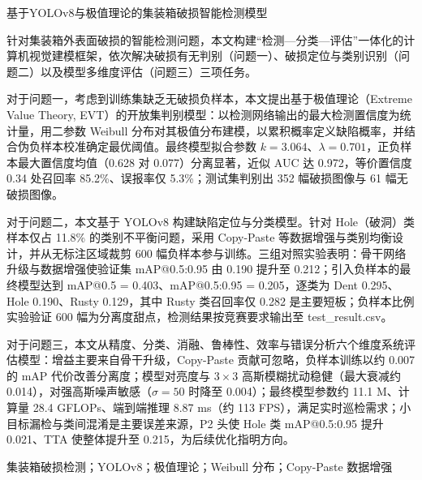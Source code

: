 \begin{center}
  {\heiti 基于YOLOv8与极值理论的集装箱破损智能检测模型}
\end{center}

\vspace{1.5em}


针对集装箱外表面破损的智能检测问题，本文构建“检测—分类—评估”一体化的计算机视觉建模框架，依次解决破损有无判别（问题一）、破损定位与类别识别（问题二）以及模型多维度评估（问题三）三项任务。

\vspace{0.35em}
对于问题一，考虑到训练集缺乏无破损负样本，本文提出基于极值理论（Extreme Value Theory, EVT）的开放集判别模型：以检测网络输出的最大检测置信度为统计量，用二参数 Weibull 分布对其极值分布建模，以累积概率定义缺陷概率，并结合伪负样本校准确定最优阈值。最终模型拟合参数 $k=3.064$、$\lambda=0.701$，正负样本最大置信度均值（0.628 对 0.077）分离显著，近似 AUC 达 0.972，等价置信度 0.34 处召回率 85.2\%、误报率仅 5.3\%；测试集判别出 352 幅破损图像与 61 幅无破损图像。

\vspace{0.35em}
对于问题二，本文基于 YOLOv8 构建缺陷定位与分类模型。针对 Hole（破洞）类样本仅占 11.8\% 的类别不平衡问题，采用 Copy-Paste 等数据增强与类别均衡设计，并从无标注区域裁剪 600 幅负样本参与训练。三组对照实验表明：骨干网络升级与数据增强使验证集 mAP@0.5:0.95 由 0.190 提升至 0.212；引入负样本的最终模型达到 mAP@0.5 = 0.403、mAP@0.5:0.95 = 0.205，逐类为 Dent 0.295、Hole 0.190、Rusty 0.129，其中 Rusty 类召回率仅 0.282 是主要短板；负样本比例实验验证 600 幅为分离度甜点，检测结果按竞赛要求输出至 test\_result.csv。

\vspace{0.35em}
对于问题三，本文从精度、分类、消融、鲁棒性、效率与错误分析六个维度系统评估模型：增益主要来自骨干升级，Copy-Paste 贡献可忽略，负样本训练以约 0.007 的 mAP 代价改善分离度；模型对亮度与 $3\times3$ 高斯模糊扰动稳健（最大衰减约 0.014），对强高斯噪声敏感（$\sigma=50$ 时降至 0.004）；最终模型参数约 11.1 M、计算量 28.4 GFLOPs、端到端推理 8.87 ms（约 113 FPS），满足实时巡检需求；小目标漏检与类间混淆是主要误差来源，P2 头使 Hole 类 mAP@0.5:0.95 提升 0.021、TTA 使整体提升至 0.215，为后续优化指明方向。

\vspace{1em}

{ 集装箱破损检测；YOLOv8；极值理论；Weibull 分布；Copy-Paste 数据增强}

\clearpage
